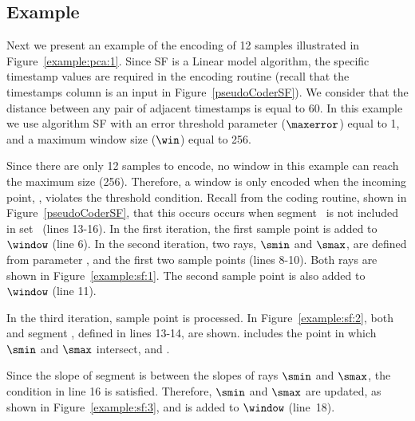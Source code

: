 \vspace{-17pt}
\subsection{Example}
\label{algo:sf:example}


\vspace{-3pt}
Next we present an example of the encoding of 12 samples illustrated in Figure~\ref{example:pca:1}. Since SF is a Linear model algorithm, the specific timestamp values are required in the encoding routine (recall that the timestamps column is an input in Figure~\ref{pseudoCoderSF}). We consider that the distance between any pair of adjacent timestamps is equal to 60. In this example we use algorithm SF with an error threshold parameter ($\maxerror$) equal to 1, and a maximum window size ($\win$) equal to 256.


Since there are only 12 samples to encode, no window in this example can reach the maximum size (256). Therefore, a window is only encoded when the incoming point, \point, violates the threshold condition. Recall from the coding routine, shown in Figure~\ref{pseudoCoderSF}, that this occurs occurs when segment \EseE\ is not included in set \segmentSet\ (lines 13-16). In the first iteration, the first sample point is added to $\window$ (line 6). In the second iteration, two rays, $\smin$ and $\smax$, are defined from parameter \maxerror, and the first two sample points (lines 8-10). Both rays are shown in Figure~\ref{example:sf:1}. The second sample point is also added to $\window$ (line 11). 




\clearpage


In the third iteration, sample point  is processed. In Figure~\ref{example:sf:2}, both  and segment , defined in lines 13-14, are shown.  includes the point in which $\smin$ and $\smax$ intersect, and .




Since the slope of segment  is between the slopes of rays $\smin$ and $\smax$, the condition in line 16 is satisfied. Therefore, $\smin$ and $\smax$ are updated, as shown in Figure~\ref{example:sf:3}, and  is added to $\window$ (line~18). 




